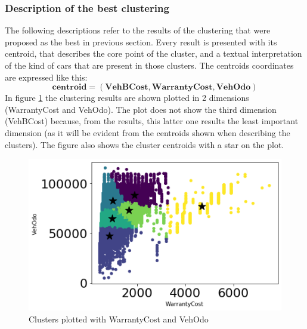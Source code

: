 \documentclass{article}
\begin{document}
	
	\subsubsection{Description of the best clustering}
	\label{sec:clusterdescr}
	The following descriptions refer to the results of the clustering that were proposed as the best in previous section. Every result is presented with its centroid, that describes the core point of the cluster, and a textual interpretation of the kind of cars that are present in those clusters. 
	The centroids coordinates are expressed like this:  
	$$ \mathbf{centroid} = (\mathbf{VehBCost}, \mathbf{WarrantyCost}, \mathbf{VehOdo}) $$
	In figure \ref{fig:centroid} the clustering results are shown plotted in 2 dimensions (WarrantyCost and VehOdo). The plot does not show the third dimension (VehBCost) because, from the results, this latter one results the least important dimension (as it will be evident from the centroids shown when describing the clusters).
	The figure also shows the cluster centroids with a star on the plot. 
	
	\begin{figure}[H]
		\centering
		\includegraphics[width=.6\textwidth, keepaspectratio]{centroid}
		\caption{{Clusters plotted with WarrantyCost and VehOdo}}
		\label{fig:centroid}
	\end{figure}
	
\end{document}
